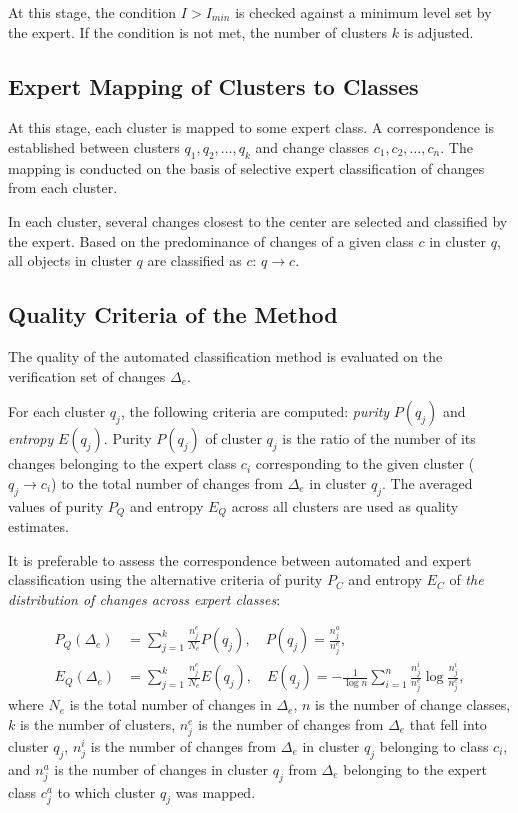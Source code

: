 \documentclass[11pt,a4paper]{article}
\begin{document}
At this stage, the condition $I > I_{min}$ is checked against a minimum level set by the expert. If the condition is not met, the number of clusters $k$ is adjusted.

\subsection{Expert Mapping of Clusters to Classes}
\label{sec:mapping}

At this stage, each cluster is mapped to some expert class. A correspondence is established between clusters $q_1, q_2, \ldots, q_k$ and change classes $c_1, c_2, \ldots, c_n$. The mapping is conducted on the basis of selective expert classification of changes from each cluster.

In each cluster, several changes closest to the center are selected and classified by the expert. Based on the predominance of changes of a given class $c$ in cluster $q$, all objects in cluster $q$ are classified as $c$: $q \rightarrow c$.

\subsection{Quality Criteria of the Method}
\label{sec:quality_method}

The quality of the automated classification method is evaluated on the verification set of changes $\Delta_e$.

For each cluster $q_j$, the following criteria are computed: \textit{purity} $P(q_j)$ and \textit{entropy} $E(q_j)$. Purity $P(q_j)$ of cluster $q_j$ is the ratio of the number of its changes belonging to the expert class $c_i$ corresponding to the given cluster ($q_j \rightarrow c_i$) to the total number of changes from $\Delta_e$ in cluster $q_j$. The averaged values of purity $P_Q$ and entropy $E_Q$ across all clusters are used as quality estimates.

It is preferable to assess the correspondence between automated and expert classification using the alternative criteria of purity $P_C$ and entropy $E_C$ of \textit{the distribution of changes across expert classes}:

\begin{align}
    P_Q(\Delta_e) &= \sum_{j=1}^{k} \frac{n_j^e}{N_e} P(q_j), \quad P(q_j) = \frac{n_j^a}{n_j^e}, \label{eq:purity_q} \\
    E_Q(\Delta_e) &= \sum_{j=1}^{k} \frac{n_j^e}{N_e} E(q_j), \quad E(q_j) = -\frac{1}{\log n} \sum_{i=1}^{n} \frac{n_j^i}{n_j^e} \log \frac{n_j^i}{n_j^e}, \label{eq:entropy_q}
\end{align}
where $N_e$ is the total number of changes in $\Delta_e$, $n$ is the number of change classes, $k$ is the number of clusters, $n_j^e$ is the number of changes from $\Delta_e$ that fell into cluster $q_j$, $n_j^i$ is the number of changes from $\Delta_e$ in cluster $q_j$ belonging to class $c_i$, and $n_j^a$ is the number of changes in cluster $q_j$ from $\Delta_e$ belonging to the expert class $c_j^a$ to which cluster $q_j$ was mapped.
\end{document}
